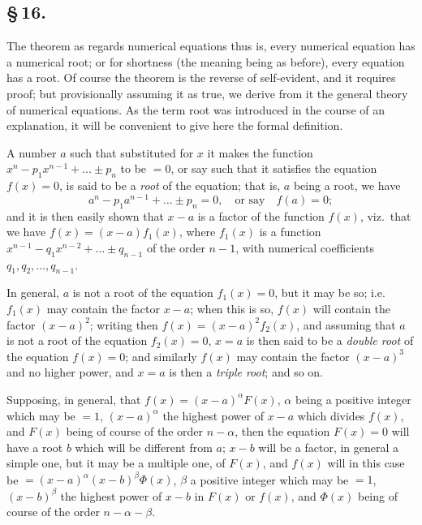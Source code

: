 \documentclass[11pt,a4paper]{book}
\begin{document}
\subsection*{\S\,16.}

The theorem as regards numerical equations thus is, every numerical equation has a numerical root; or for shortness (the meaning being as before), every equation has a root. Of course the theorem is the reverse of self-evident, and it requires proof; but provisionally assuming it as true, we derive from it the general theory of numerical equations. As the term root was introduced in the course of an explanation, it will be convenient to give here the formal definition.

A number $a$ such that substituted for $x$ it makes the function $x^{n} - p_{1}x^{n-1} + \ldots \pm p_{n}$ to be $=0$, or say such that it satisfies the equation $f(x) = 0$, is said to be a \textit{root} of the equation; that is, $a$ being a root, we have
\[
a^{n} - p_{1}a^{n-1} + \ldots \pm p_{n} = 0, \quad \text{or say} \quad f(a) = 0;
\]
and it is then easily shown that $x - a$ is a factor of the function $f(x)$, viz.\ that we have $f(x) = (x - a)f_{1}(x)$, where $f_{1}(x)$ is a function $x^{n-1} - q_{1}x^{n-2} + \ldots \pm q_{n-1}$ of the order $n - 1$, with numerical coefficients $q_{1}, q_{2}, \ldots, q_{n-1}$.

In general, $a$ is not a root of the equation $f_{1}(x) = 0$, but it may be so; i.e.\ $f_{1}(x)$ may contain the factor $x - a$; when this is so, $f(x)$ will contain the factor $(x - a)^{2}$; writing then $f(x) = (x - a)^{2}f_{2}(x)$, and assuming that $a$ is not a root of the equation $f_{2}(x) = 0$, $x = a$ is then said to be a \textit{double root} of the equation $f(x) = 0$; and similarly $f(x)$ may contain the factor $(x - a)^{3}$ and no higher power, and $x = a$ is then a \textit{triple root}; and so on.

Supposing, in general, that $f(x) = (x - a)^{\alpha}F(x)$, $\alpha$ being a positive integer which may be $=1$, $(x - a)^{\alpha}$ the highest power of $x - a$ which divides $f(x)$, and $F(x)$ being of course of the order $n - \alpha$, then the equation $F(x) = 0$ will have a root $b$ which will be different from $a$; $x - b$ will be a factor, in general a simple one, but it may be a multiple one, of $F(x)$, and $f(x)$ will in this case be $= (x - a)^{\alpha}(x - b)^{\beta}\Phi(x)$, $\beta$ a positive integer which may be $=1$, $(x - b)^{\beta}$ the highest power of $x - b$ in $F(x)$ or $f(x)$, and $\Phi(x)$ being of course of the order $n - \alpha - \beta$.
\end{document}
